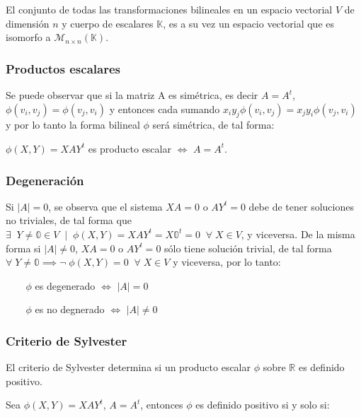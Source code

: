 \documentclass{preset}
\begin{document}
\noindent El conjunto de todas las transformaciones bilineales en un espacio vectorial $V$ de dimensión $n$ y cuerpo de escalares $\mathbb{K}$, es a su vez un espacio vectorial que es isomorfo a $\mathcal{M}_{n \times n} (\mathbb{K})$.

\vspace{-15pt}
\subsubsection{Productos escalares}
Se puede observar que si la matriz A es simétrica, es decir $A=A^t$, $\phi(v_i,v_j)=\phi(v_j,v_i)$ y entonces cada sumando $x_i y_j\phi(v_i,v_j)= x_j y_i \phi(v_j,v_i)$ y por lo tanto la forma bilineal $\phi$ será simétrica, de tal forma:

$\phi(X,Y)=XAY^t$ es producto escalar $\iff$ $A=A^t$.

\vspace{-15pt}
\subsubsection{Degeneración}
Si $|A|=0$, se observa que el sistema $XA=0$ o $AY^t=0$ debe de tener soluciones no triviales, de tal forma que $\exists \;\; Y\neq \mathbb{0} \in V \;\; \vert \;\; \phi(X,Y)=XAY^t=X\mathbb{0}^t=0 \;\; \forall \; X \in V$, y viceversa. De la misma forma si $|A|\neq0$, $XA=0$ o $AY^t=0$ sólo tiene solución trivial, de tal forma $\forall \; Y\neq\mathbb{0} \implies \neg \; \phi(X,Y)=0 \;\; \forall \; X \in V$ y viceversa, por lo tanto:

\vspace{-10pt}
\begin{itemize}
	\item[$ $] $\phi$ es degenerado  \;\;  $\iff$ $|A|=0$
	\vspace{-10pt}
    \item[$ $] $\phi$ es no degnerado  $\iff$ $|A|\neq0$
\end{itemize} 

\vspace{-15pt}
\subsubsection{Criterio de Sylvester}
El criterio de Sylvester determina si un producto escalar $\phi$ sobre $\mathbb{R}$ es definido positivo.
 
\noindent Sea $\phi(X,Y)=XAY^t$, $A=A^t$, entonces $\phi$ es definido positivo si y solo si:
\end{document}
